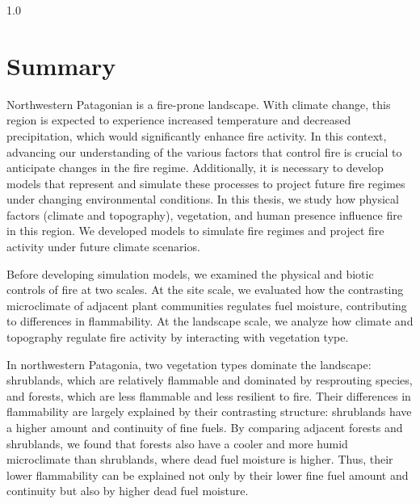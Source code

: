 \newpage{\ }
\thispagestyle{empty}

\begin{spacing}{1.0} %

\chapter*{Summary}

\vspace{.5cm}

Northwestern Patagonian is a fire-prone landscape. With climate change, this region is expected to experience increased temperature and decreased precipitation, which would significantly enhance fire activity. In this context, advancing our understanding of the various factors that control fire is crucial to anticipate changes in the fire regime. Additionally, it is necessary to develop models that represent and simulate these processes to project future fire regimes under changing environmental conditions. In this thesis, we study how physical factors (climate and topography), vegetation, and human presence influence fire in this region. We developed models to simulate fire regimes and project fire activity under future climate scenarios. 

Before developing simulation models, we examined the physical and biotic controls of fire at two scales. At the site scale, we evaluated how the contrasting microclimate of adjacent plant communities regulates fuel moisture, contributing to differences in flammability. At the landscape scale, we analyze how climate and topography regulate fire activity by interacting with vegetation type.

In northwestern Patagonia, two vegetation types dominate the landscape: shrublands, which are relatively flammable and dominated by resprouting species, and forests, which are less flammable and less resilient to fire. Their differences in flammability are largely explained by their contrasting structure: shrublands have a higher amount and continuity of fine fuels. By comparing adjacent forests and shrublands, we found that forests also have a cooler and more humid microclimate than shrublands, where dead fuel moisture is higher. Thus, their lower flammability can be explained not only by their lower fine fuel amount and continuity but also by higher dead fuel moisture.


\end{spacing}
